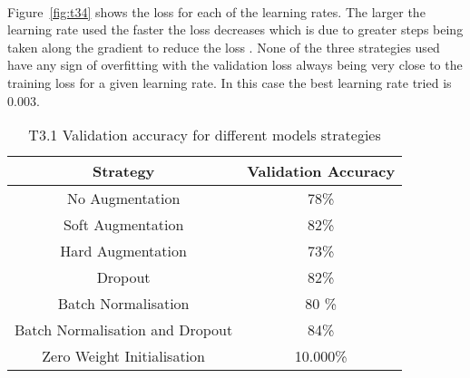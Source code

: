 \documentclass[10pt,twocolumn,letterpaper]{article}
\begin{document}
\\
Figure~\ref{fig:t34} shows the loss for each of the learning rates. The larger the learning rate used the faster the loss decreases which is due to greater steps being taken along the gradient to reduce the loss \cite{slides3}. None of the three strategies used have any sign of overfitting with the validation loss always being very close to the training loss for a given learning rate. In this case the best learning rate tried is $0.003$.


\begin{table}[ht]
    \small
    \centering
    \begin{tabular}{|c|c|}
        \hline
        Strategy     & Validation Accuracy \\
        \hline
        No Augmentation  & 78\%           \\
        Soft Augmentation  & 82\%            \\
        Hard Augmentation & 73\%           \\
        Dropout & 82\% \\
        Batch Normalisation & 80 \% \\
        Batch Normalisation and Dropout & 84\% \\
        Zero Weight Initialisation & 10.000\% \\
        \hline
    \end{tabular}
    \medbreak
    \caption{T3.1 Validation accuracy for different models strategies}
    \vspace{-0.7cm}
    \label{table:t311}
\end{table}
\end{document}
